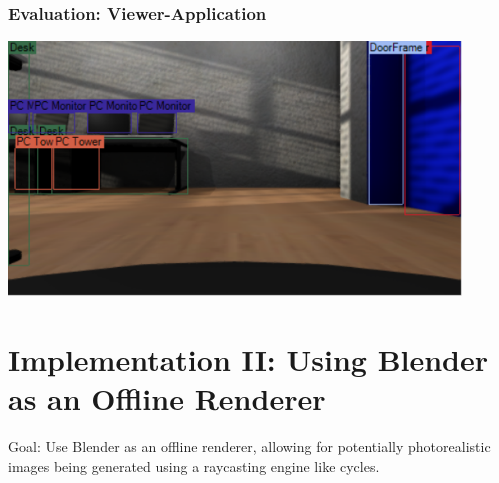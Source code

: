 \subsubsection{Evaluation: Viewer-Application}

\begin{center}
\noindent\includegraphics[width=12cm]{tex/img/ch05/VERE_Viewer_01.png}
\label{fig:vere-viewer}
\end{center}
\section{Implementation II: Using Blender as an Offline Renderer}
Goal: Use Blender as an offline renderer, allowing for potentially photorealistic images being generated using a raycasting engine like cycles.


